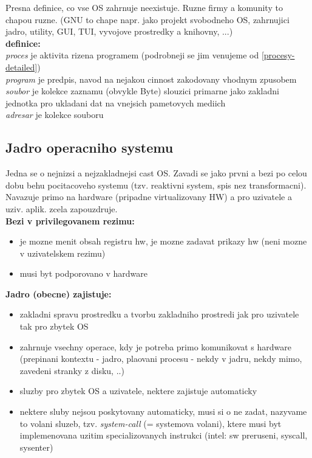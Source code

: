 \documentclass[a4paper, 11pt]{article}
\begin{document}
\noindent Presna definice, co vse OS zahrnuje neexistuje. Ruzne firmy a komunity to chapou ruzne. (GNU to chape napr. jako projekt svobodneho OS, zahrnujici jadro, utility, GUI, TUI, vyvojove prostredky a knihovny, ...) \\[1em]

\noindent\textbf{definice:} \\[0.5em] \label{procesy} \label{soubory}
\textit{proces} je aktivita rizena programem (podrobneji se jim venujeme od \ref{procesy-detailed}) \\[0.2em]
\textit{program} je predpis, navod na nejakou cinnost zakodovany vhodnym zpusobem \\[0.2em]
\textit{soubor} je kolekce zaznamu (obvykle Byte) slouzici primarne jako zakladni jednotka pro ukladani dat na vnejsich pametovych mediich \\[0.2em]
\textit{adresar} je kolekce souboru

\newpage

\subsection{Jadro operacniho systemu}

Jedna se o nejnizsi a nejzakladnejsi cast OS. Zavadi se jako prvni a bezi po celou dobu behu pocitacoveho systemu (tzv. reaktivni system, spis nez transformacni). Navazuje primo na hardware (pripadne virtualizovany HW) a pro uzivatele a uziv. aplik. zcela zapouzdruje. \\

\noindent\textbf{Bezi v privilegovanem rezimu:}
\begin{itemize}
    \item je mozne menit obsah registru hw, je mozne zadavat prikazy hw (neni mozne v uzivatelskem rezimu)
    \item musi byt podporovano v hardware \\
\end{itemize}

\noindent\textbf{Jadro (obecne) zajistuje:}
\begin{itemize}
    \item zakladni spravu prostredku a tvorbu zakladniho prostredi jak pro uzivatele tak pro zbytek OS
    \item zahrnuje vsechny operace, kdy je potreba primo komunikovat s hardware (prepinani kontextu - jadro, plaovani procesu - nekdy v jadru, nekdy mimo, zavedeni stranky z disku, ..)
    \item sluzby pro zbytek OS a uzivatele, nektere zajistuje automaticky
    \item nektere sluby nejsou poskytovany automaticky, musi si o ne zadat, nazyvame to volani sluzeb, tzv. \textit{system-call} \label{syscall} (= systemova volani), ktere musi byt implemenovana uzitim specializovanych instrukci (intel: sw preruseni, syscall, sysenter) \\
\end{itemize}
\end{document}
